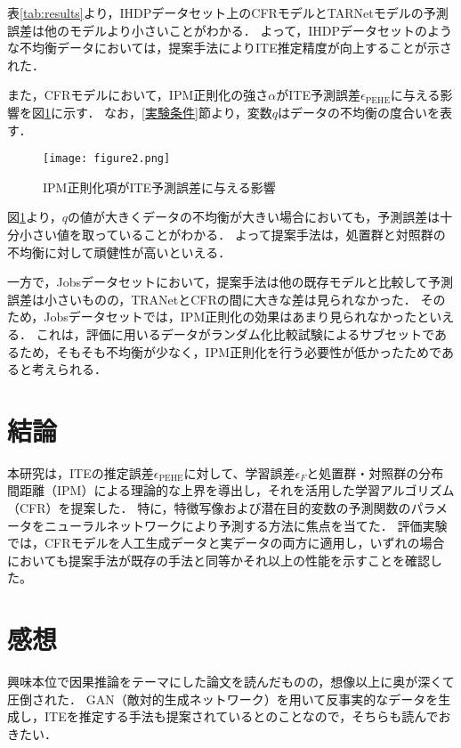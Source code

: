 \documentclass[dvipdfmx]{jreport}
\begin{document}
表\ref{tab:results}より，IHDPデータセット上のCFRモデルとTARNetモデルの予測誤差は他のモデルより小さいことがわかる．
よって，IHDPデータセットのような不均衡データにおいては，提案手法によりITE推定精度が向上することが示された．

また，CFRモデルにおいて，IPM正則化の強さ$\alpha$がITE予測誤差$\epsilon_{\mathrm{PEHE}}$に与える影響を図\ref{fig:cfr}に示す．
なお，\ref{実験条件}節より，変数$q$はデータの不均衡の度合いを表す．
\begin{figure}[h]
    \begin{center}
        \texttt{[image: figure2.png]}
    \end{center}
    \caption{IPM正則化項がITE予測誤差に与える影響} \label{fig:cfr}
\end{figure}
図\ref{fig:cfr}より，$q$の値が大きくデータの不均衡が大きい場合においても，予測誤差は十分小さい値を取っていることがわかる．
よって提案手法は，処置群と対照群の不均衡に対して頑健性が高いといえる．

一方で，Jobsデータセットにおいて，提案手法は他の既存モデルと比較して予測誤差は小さいものの，TRANetとCFRの間に大きな差は見られなかった．
そのため，Jobsデータセットでは，IPM正則化の効果はあまり見られなかったといえる．
これは，評価に用いるデータがランダム化比較試験によるサブセットであるため，そもそも不均衡が少なく，IPM正則化を行う必要性が低かったためであると考えられる．

\newpage
\section{結論}
本研究は，ITEの推定誤差$\epsilon_{\mathrm{PEHE}}$に対して、学習誤差$\epsilon_{F}$と処置群・対照群の分布間距離（IPM）による理論的な上界を導出し，それを活用した学習アルゴリズム（CFR）を提案した．
特に，特徴写像および潜在目的変数の予測関数のパラメータをニューラルネットワークにより予測する方法に焦点を当てた．
評価実験では，CFRモデルを人工生成データと実データの両方に適用し，いずれの場合においても提案手法が既存の手法と同等かそれ以上の性能を示すことを確認した。

\section{感想}
興味本位で因果推論をテーマにした論文を読んだものの，想像以上に奥が深くて圧倒された．
GAN（敵対的生成ネットワーク）を用いて反事実的なデータを生成し，ITEを推定する手法も提案されているとのことなので，そちらも読んでおきたい．
\end{document}
